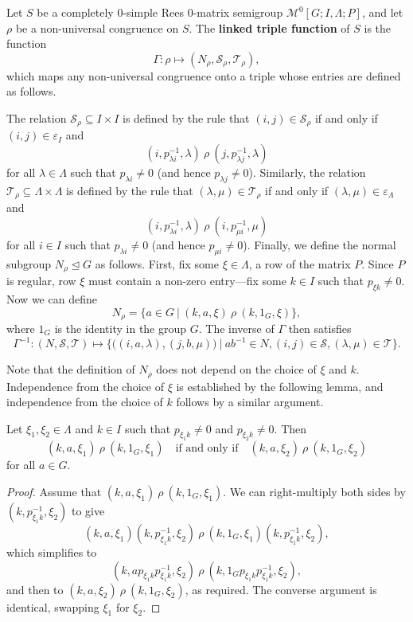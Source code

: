 \begin{definition}
  \label{def:linked-triple-function}
  Let $S$ be a completely 0-simple Rees 0-matrix semigroup
  $\mathcal{M}^0[G;I,\Lambda;P]$, and let $\rho$ be a non-universal congruence
  on $S$.
  The \textbf{linked triple function} of $S$ is the function
  $$\Gamma: \rho \mapsto (N_\rho, \mathcal{S}_\rho, \mathcal{T}_\rho),$$
  which maps any non-universal congruence onto a triple whose entries are
  defined as follows.

  The relation $\mathcal{S}_\rho \subseteq I \times I$ is defined by the rule that
  $(i,j) \in \mathcal{S}_\rho$ if and only if $(i,j) \in \varepsilon_I$ and
  $$(i, p_{\lambda i}^{-1}, \lambda) ~\rho~ (j, p_{\lambda j}^{-1}, \lambda)$$
  for all $\lambda \in \Lambda$ such that $p_{\lambda i} \neq 0$ (and hence
  $p_{\lambda j} \neq 0$).  Similarly, the relation
  $\mathcal{T}_\rho \subseteq \Lambda \times \Lambda$ is defined by the rule that
  $(\lambda,\mu) \in \mathcal{T}_\rho$ if and only if
  $(\lambda,\mu) \in \varepsilon_\Lambda$ and
  $$(i, p_{\lambda i}^{-1}, \lambda) ~\rho~ (i, p_{\mu i}^{-1}, \mu)$$
  for all $i \in I$ such that $p_{\lambda i} \neq 0$ (and hence
  $p_{\mu i} \neq 0$).  Finally, we define the normal subgroup
  $N_\rho \trianglelefteq G$ as follows.  First, fix some $\xi \in \Lambda$, a
  row of the matrix $P$.  Since $P$ is regular, row $\xi$ must contain a
  non-zero entry---fix some $k \in I$ such that $p_{\xi k} \neq 0$.  Now we can
  define
  $$N_\rho = \{a \in G ~|~ (k, a, \xi) ~\rho~ (k, 1_G, \xi)\},$$
  where $1_G$ is the identity in the group $G$.
  The inverse of $\Gamma$ then satisfies
  $$\Gamma^{-1}: (N, \mathcal{S}, \mathcal{T}) \mapsto
  \Big\{
  \big((i, a, \lambda), (j, b, \mu)\big) ~\Big|~
  ab^{-1} \in N, %
  (i,j) \in \mathcal{S},
  (\lambda,\mu) \in \mathcal{T}
  \Big\}.$$
\end{definition}

Note that the definition of $N_\rho$ does not depend on the choice of $\xi$ and
$k$.  Independence from the choice of $\xi$ is established by the following
lemma, and independence from the choice of $k$ follows by a similar argument.

\begin{lemma}
  Let $\xi_1, \xi_2 \in \Lambda$ and $k \in I$ such that $p_{\xi_1k}^{} \neq 0$
  and $p_{\xi_2 k}^{} \neq 0$.  Then
  $$(k, a, \xi_1) ~\rho~ (k, 1_G, \xi_1)
  \quad \text{if and only if} \quad
  (k, a, \xi_2) ~\rho~ (k, 1_G, \xi_2)$$
  for all $a \in G$.
  \begin{proof}
    Assume that $(k, a, \xi_1) ~\rho~ (k, 1_G, \xi_1)$.  We can right-multiply
    both sides by $(k, p_{\xi_1k}^{-1}, \xi_2)$ to give
    $$(k, a, \xi_1)(k, p_{\xi_1k}^{-1}, \xi_2)
    ~\rho~ (k, 1_G, \xi_1)(k, p_{\xi_1k}^{-1}, \xi_2),$$
    which simplifies to
    $$(k, a p_{\xi_1k}^{} p_{\xi_1k}^{-1}, \xi_2)
    ~\rho~ (k, 1_G p_{\xi_1k}^{} p_{\xi_1k}^{-1}, \xi_2),$$
    and then to
    $(k, a, \xi_2) ~\rho~ (k, 1_G, \xi_2)$,
    as required.
    The converse argument is identical, swapping $\xi_1$ for $\xi_2$.
  \end{proof}
\end{lemma}

